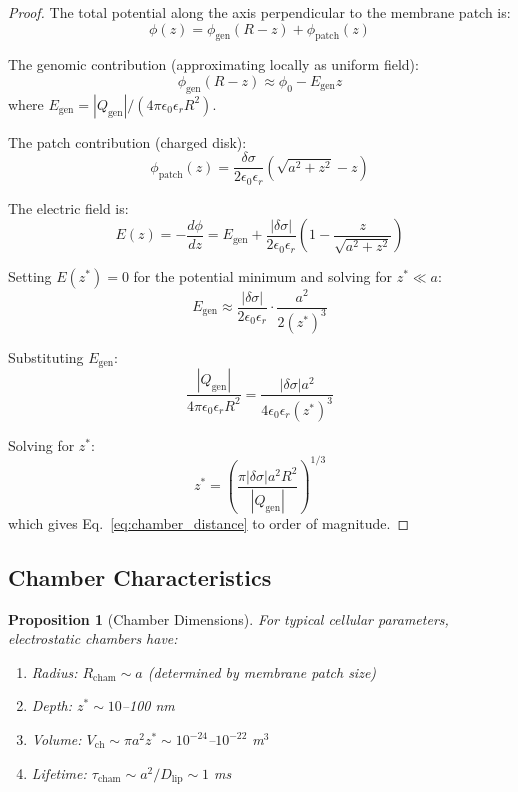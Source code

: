 \documentclass[twocolumn,10pt,aps,prd,superscriptaddress,floatfix,nofootinbib]{revtex4-2}
\newtheorem{proposition}[theorem]{Proposition}
\theoremstyle{remark}
\begin{document}
\begin{proof}
The total potential along the axis perpendicular to the membrane patch is:
\begin{equation}
\phi(z) = \phi_{\mathrm{gen}}(R-z) + \phi_{\mathrm{patch}}(z)
\end{equation}

The genomic contribution (approximating locally as uniform field):
\begin{equation}
\phi_{\mathrm{gen}}(R-z) \approx \phi_0 - E_{\mathrm{gen}} z
\end{equation}
where $E_{\mathrm{gen}} = |Q_{\mathrm{gen}}|/(4\pi\epsilon_0\epsilon_r R^2)$.

The patch contribution (charged disk):
\begin{equation}
\phi_{\mathrm{patch}}(z) = \frac{\delta\sigma}{2\epsilon_0\epsilon_r}\left(\sqrt{a^2 + z^2} - z\right)
\end{equation}

The electric field is:
\begin{equation}
E(z) = -\frac{d\phi}{dz} = E_{\mathrm{gen}} + \frac{|\delta\sigma|}{2\epsilon_0\epsilon_r}\left(1 - \frac{z}{\sqrt{a^2 + z^2}}\right)
\end{equation}

Setting $E(z^*) = 0$ for the potential minimum and solving for $z^* \ll a$:
\begin{equation}
E_{\mathrm{gen}} \approx \frac{|\delta\sigma|}{2\epsilon_0\epsilon_r} \cdot \frac{a^2}{2(z^*)^3}
\end{equation}

Substituting $E_{\mathrm{gen}}$:
\begin{equation}
\frac{|Q_{\mathrm{gen}}|}{4\pi\epsilon_0\epsilon_r R^2} = \frac{|\delta\sigma| a^2}{4\epsilon_0\epsilon_r (z^*)^3}
\end{equation}

Solving for $z^*$:
\begin{equation}
z^* = \left(\frac{\pi |\delta\sigma| a^2 R^2}{|Q_{\mathrm{gen}}|}\right)^{1/3}
\end{equation}
which gives Eq.~\eqref{eq:chamber_distance} to order of magnitude.
\end{proof}

\subsection{Chamber Characteristics}

\begin{proposition}[Chamber Dimensions]
\label{prop:chamber_dims}
For typical cellular parameters, electrostatic chambers have:
\begin{enumerate}
\item Radius: $R_{\mathrm{cham}} \sim a$ (determined by membrane patch size)
\item Depth: $z^* \sim 10$--100 nm
\item Volume: $V_{\mathrm{ch}} \sim \pi a^2 z^* \sim 10^{-24}$--$10^{-22}$ m$^3$
\item Lifetime: $\tau_{\mathrm{cham}} \sim a^2/D_{\mathrm{lip}} \sim 1$ ms
\end{enumerate}
\end{proposition}
\end{document}

